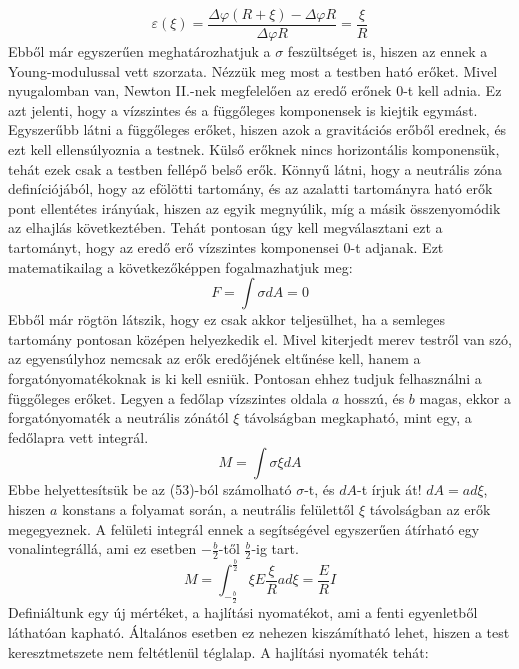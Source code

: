 \documentclass[a4paper,12pt]{article}
\begin{document}
\begin{equation}
\varepsilon(\xi)=\frac{\Delta\varphi(R+\xi)-\Delta\varphi R}{\Delta\varphi R}=\frac{\xi}{R}
\end{equation}
Ebből már egyszerűen meghatározhatjuk a $\sigma$ feszültséget is, hiszen az ennek a Young-modulussal vett szorzata. Nézzük meg most a testben ható erőket. Mivel nyugalomban van, Newton II.-nek megfelelően az eredő erőnek 0-t kell adnia. Ez azt jelenti, hogy a vízszintes és a függőleges komponensek is kiejtik egymást. Egyszerűbb látni a függőleges erőket, hiszen azok a gravitációs erőből erednek, és ezt kell ellensúlyoznia a testnek. Külső erőknek nincs horizontális komponensük, tehát ezek csak a testben fellépő belső erők. Könnyű látni, hogy a neutrális zóna definíciójából, hogy az efölötti tartomány, és az azalatti tartományra ható erők pont ellentétes irányúak, hiszen az egyik megnyúlik, míg a másik összenyomódik az elhajlás következtében. Tehát pontosan úgy kell megválasztani ezt a tartományt, hogy az eredő erő vízszintes komponensei 0-t adjanak. Ezt matematikailag a következőképpen fogalmazhatjuk meg:
\begin{equation}
F=\int\sigma dA=0
\end{equation}
Ebből már rögtön látszik, hogy ez csak akkor teljesülhet, ha a semleges tartomány pontosan középen helyezkedik el.
Mivel kiterjedt merev testről van szó, az egyensúlyhoz nemcsak az erők eredőjének eltűnése kell, hanem a forgatónyomatékoknak is ki kell esniük. Pontosan ehhez tudjuk felhasználni a függőleges erőket. Legyen a fedőlap vízszintes oldala $a$ hosszú, és $b$ magas, ekkor a forgatónyomaték a neutrális zónától $\xi$ távolságban megkapható, mint egy, a fedőlapra vett integrál.
\begin{equation}
M=\int\sigma\xi dA
\end{equation}
Ebbe helyettesítsük be az (53)-ból számolható $\sigma$-t, és $dA$-t írjuk át! $dA=ad\xi$, hiszen $a$ konstans a folyamat során, a neutrális felülettől $\xi$ távolságban az erők megegyeznek. A felületi integrál ennek a segítségével egyszerűen átírható egy vonalintegrállá, ami ez esetben $-\frac{b}{2}$-től $\frac{b}{2}$-ig tart.
\begin{equation}
M=\int_{-\frac{b}{2}}^{\frac{b}{2}}\xi E\frac{\xi}{R}a d\xi=\frac{E}{R}I
\end{equation}
Definiáltunk egy új mértéket, a hajlítási nyomatékot, ami a fenti egyenletből láthatóan kapható. Általános esetben ez nehezen kiszámítható lehet, hiszen a test keresztmetszete nem feltétlenül téglalap. A hajlítási nyomaték tehát:
\end{document}
